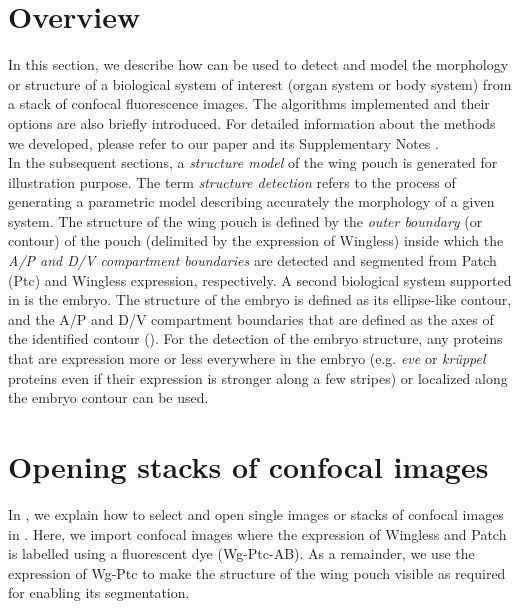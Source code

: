 \section{Overview}
In this section, we describe how \wingj can be used to detect and model the morphology or structure of a biological system of interest (organ system or body system) from a stack of confocal fluorescence images. The algorithms implemented and their options are also briefly introduced. For detailed information about the methods we developed, please refer to our paper and its Supplementary Notes \autocite{schaffter2013}.\\

In the subsequent sections, a \textit{structure model} of the \droso wing pouch is generated for illustration purpose. The term \textit{structure detection} refers to the process of generating a parametric model describing accurately the morphology of a given system. The structure of the wing pouch is defined by the \emph{outer boundary} (or contour) of the pouch (delimited by the expression of Wingless) inside which the \textit{A/P and D/V compartment boundaries} are detected and segmented from Patch (Ptc) and Wingless expression, respectively. A second biological system supported in \wingj is the \droso embryo. The structure of the embryo is defined as its ellipse-like contour, and the A/P and D/V compartment boundaries that are defined as the axes of the identified contour (). For the detection of the embryo structure, any proteins that are expression more or less everywhere in the embryo (e.g. \textit{eve} or \textit{kr\"{u}ppel} proteins even if their expression is stronger along a few stripes) or localized along the embryo contour can be used.

\section{Opening stacks of confocal images} \label{sec:structure_image_loading}
In , we explain how to select and open single images or stacks of confocal images in \wingj. Here, we import confocal images where the expression of Wingless and Patch is labelled using a fluorescent dye (Wg-Ptc-AB). As a remainder, we use the expression of Wg-Ptc to make the structure of the \droso wing pouch visible as required for enabling its segmentation\autocite{schaffter2013}.\\

